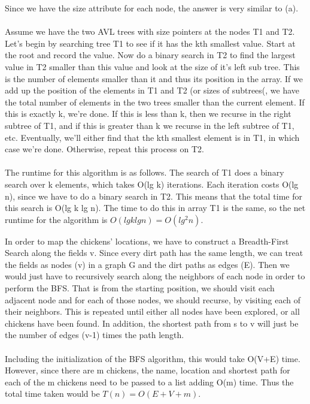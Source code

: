 \documentclass[12pt,twoside]{article}
\begin{document}
\begin{problems}
\begin{problemparts}
\problempart
Since we have the size attribute for each node, the answer is very similar to (a).
\\\\
Assume we have the two AVL trees with size pointers at the nodes T1 and T2.  Let's begin by searching tree T1 to see if it has the kth smallest value.  Start at the root and record the value. Now do a binary search in T2 to find the largest value in T2 smaller than this value and look at the size of it's left sub tree. This is the number of elements smaller than it and thus its position in the array. If we add up the position of the elements in T1 and T2 (or sizes of subtrees(, we have the total number of elements in the two trees smaller than the current element. If this is exactly k, we're done. If this is less than k, then we recurse in the right subtree of T1, and if this is greater than k we recurse in the left subtree of T1, etc. Eventually, we'll either find that the kth smallest element is in T1, in which case we're done. Otherwise, repeat this process on T2.
\\\\
The runtime for this algorithm is as follows. The search of T1 does a binary search over k elements, which takes O(lg k) iterations. Each iteration costs O(lg n), since we have to do a binary search in T2. This means that the total time for this search is O(lg k lg n). The time to do this in array T1 is the same, so the net runtime for the algorithm is $O(lg k lg n) = O(lg^2 n)$.
\end{problemparts}

\problem  %

\begin{problemparts}
\problempart
In order to map the chickens' locations, we have to construct a Breadth-First Search along the fields v. Since every dirt path has the same length, we can treat the fields as nodes (v) in a graph G and the dirt paths as edges (E). Then we would just have to recursively search along the neighbors of each node in order to perform the BFS. That is from the starting position, we should visit each adjacent node and for each of those nodes, we should recurse, by visiting each of their neighbors. This is repeated until either all nodes have been explored, or all chickens have been found. In addition, the shortest path from s to v will just be the number of edges (v-1) times the path length.
\\\\
Including the initialization of the BFS algorithm, this would take O(V+E) time. However, since there are m chickens, the name, location and shortest path for each of the m chickens need to be passed to a list adding O(m) time. Thus the total time taken would be $T(n)=O(E+V+m)$.


\end{problemparts}
\end{problems}
\end{document}
